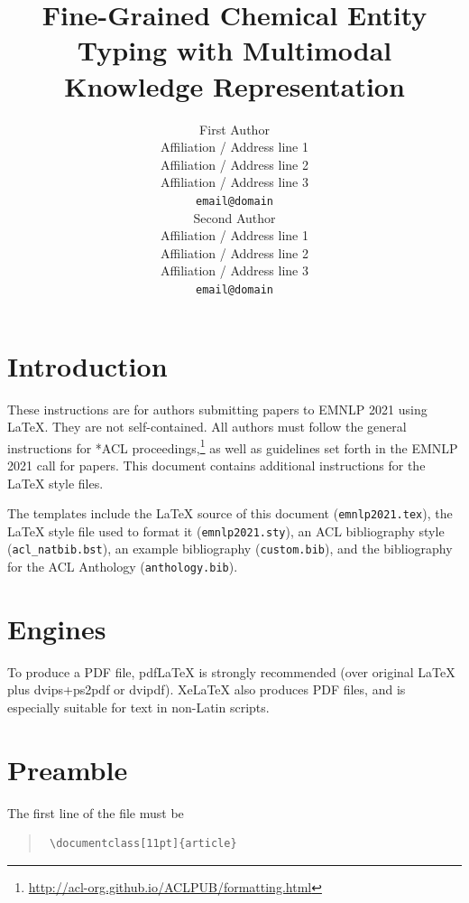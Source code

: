 \documentclass[11pt]{article}
\title{Fine-Grained Chemical Entity Typing with Multimodal Knowledge Representation}
\author{First Author \\
  Affiliation / Address line 1 \\
  Affiliation / Address line 2 \\
  Affiliation / Address line 3 \\
  \texttt{email@domain} \\\And
  Second Author \\
  Affiliation / Address line 1 \\
  Affiliation / Address line 2 \\
  Affiliation / Address line 3 \\
  \texttt{email@domain} \\}
\begin{document}
\maketitle


















 \section{Introduction}

 These instructions are for authors submitting papers to EMNLP 2021 using \LaTeX. They are not self-contained. All authors must follow the general instructions for *ACL proceedings,\footnote{\url{http://acl-org.github.io/ACLPUB/formatting.html}} as well as guidelines set forth in the EMNLP 2021 call for papers. This document contains additional instructions for the \LaTeX{} style files.

 The templates include the \LaTeX{} source of this document (\texttt{emnlp2021.tex}),
 the \LaTeX{} style file used to format it (\texttt{emnlp2021.sty}),
 an ACL bibliography style (\texttt{acl\_natbib.bst}),
 an example bibliography (\texttt{custom.bib}),
 and the bibliography for the ACL Anthology (\texttt{anthology.bib}).

 \section{Engines}

 To produce a PDF file, pdf\LaTeX{} is strongly recommended (over original \LaTeX{} plus dvips+ps2pdf or dvipdf). Xe\LaTeX{} also produces PDF files, and is especially suitable for text in non-Latin scripts.

 \section{Preamble}

 The first line of the file must be
 \begin{quote}
 \begin{verbatim}
 \documentclass[11pt]{article}
 \end{verbatim}
 \end{quote}
\end{document}
